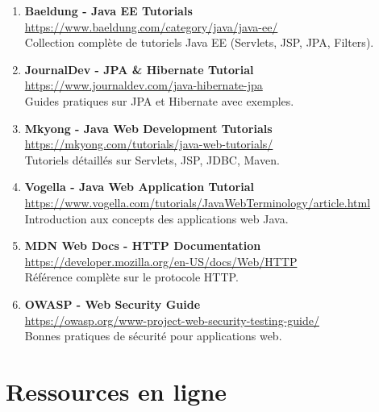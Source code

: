\documentclass[12pt,a4paper]{report}
\begin{document}
\begin{enumerate}
    \item \textbf{Baeldung - Java EE Tutorials} \\
    \url{https://www.baeldung.com/category/java/java-ee/} \\
    Collection complète de tutoriels Java EE (Servlets, JSP, JPA, Filters).
    
    \item \textbf{JournalDev - JPA \& Hibernate Tutorial} \\
    \url{https://www.journaldev.com/java-hibernate-jpa} \\
    Guides pratiques sur JPA et Hibernate avec exemples.
    
    \item \textbf{Mkyong - Java Web Development Tutorials} \\
    \url{https://mkyong.com/tutorials/java-web-tutorials/} \\
    Tutoriels détaillés sur Servlets, JSP, JDBC, Maven.
    
    \item \textbf{Vogella - Java Web Application Tutorial} \\
    \url{https://www.vogella.com/tutorials/JavaWebTerminology/article.html} \\
    Introduction aux concepts des applications web Java.
    
    \item \textbf{MDN Web Docs - HTTP Documentation} \\
    \url{https://developer.mozilla.org/en-US/docs/Web/HTTP} \\
    Référence complète sur le protocole HTTP.
    
    \item \textbf{OWASP - Web Security Guide} \\
    \url{https://owasp.org/www-project-web-security-testing-guide/} \\
    Bonnes pratiques de sécurité pour applications web.
\end{enumerate}

\section*{Ressources en ligne}
\end{document}
